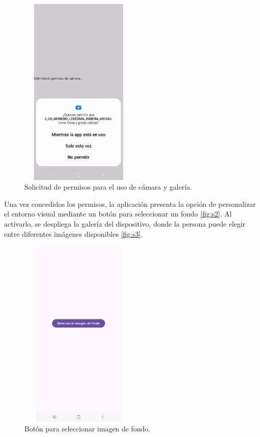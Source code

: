 \documentclass[conference]{IEEEtran}
\begin{document}
\begin{figure}[htbp]
\centering
\includegraphics[width=160pt, height=260pt]{1.png}
\caption{Solicitud de permisos para el uso de cámara y galería.}
\label{fig:s1}
\end{figure}


Una vez concedidos los permisos, la aplicación presenta la opción de personalizar el entorno visual mediante un botón para seleccionar un fondo \textcolor{red}{\autoref{fig:s2}}. Al activarlo, se despliega la galería del dispositivo, donde la persona puede elegir entre diferentes imágenes disponibles \textcolor{red}{\autoref{fig:s3}}.
\begin{figure}[htbp]
\centering
\includegraphics[width=160pt, height=260pt]{2.png}
\caption{Botón para seleccionar imagen de fondo.}
\label{fig:s2}
\end{figure}
\end{document}
